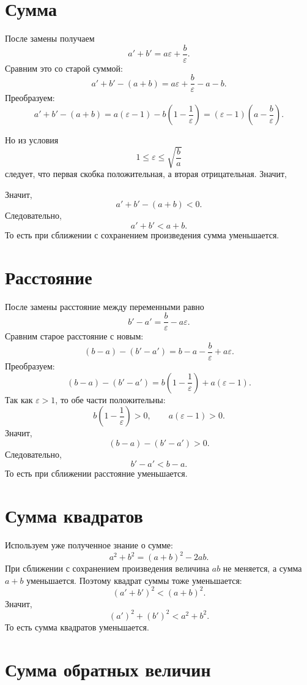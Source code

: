 \medskip

\section{Сумма}

После замены получаем
\[
    a'+b'=a\varepsilon+\frac b\varepsilon.
\]
Сравним это со старой суммой:
\[
    a'+b'-(a+b)
    =
    a\varepsilon+\frac b\varepsilon-a-b.
\]
Преобразуем:
\[
    a'+b'-(a+b)
    =
    a(\varepsilon-1)-b\left(1-\frac1\varepsilon\right) = (\varepsilon-1)\left(a-\frac b\varepsilon\right).
\]

Но из условия
\[
    1 \leq \varepsilon\le \sqrt{\frac ba}
\]
следует, что первая скобка положительная, а вторая отрицательная. Значит,

Значит,
\[
    a'+b'-(a+b)<0.
\]
Следовательно,
\[
    a'+b'<a+b.
\]
То есть при сближении с сохранением произведения сумма уменьшается.

\medskip

\section{Расстояние}

После замены расстояние между переменными равно
\[
    b'-a'=\frac b\varepsilon-a\varepsilon.
\]
Сравним старое расстояние с новым:
\[
    (b-a)-(b'-a')
    =
    b-a-\frac b\varepsilon+a\varepsilon.
\]
Преобразуем:
\[
    (b-a)-(b'-a')
    =
    b\left(1-\frac1\varepsilon\right)+a(\varepsilon-1).
\]
Так как $\varepsilon>1$, то обе части положительны:
\[
    b\left(1-\frac1\varepsilon\right)>0,
    \qquad
    a(\varepsilon-1)>0.
\]
Значит,
\[
    (b-a)-(b'-a')>0.
\]
Следовательно,
\[
    b'-a'<b-a.
\]
То есть при сближении расстояние уменьшается.

\medskip

\section{Сумма квадратов}

Используем уже полученное знание о сумме:
\[
    a^2+b^2=(a+b)^2-2ab.
\]
При сближении с сохранением произведения величина $ab$ не меняется, а сумма $a+b$ уменьшается. Поэтому квадрат суммы тоже уменьшается:
\[
    (a'+b')^2<(a+b)^2.
\]
Значит,
\[
    (a')^2+(b')^2<a^2+b^2.
\]
То есть сумма квадратов уменьшается.

\medskip

\section{Сумма обратных величин}

